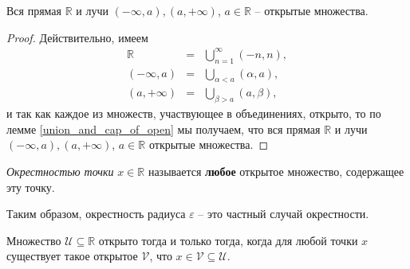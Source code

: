 \begin{corollary}\label{R_is_open}
  Вся прямая $\mathbb{R}$ и лучи $(-\infty, a), (a, +\infty)$, $a\in \mathbb{R}$ -- открытые множества.
\end{corollary}
\begin{proof}
    Действительно, имеем
    \begin{eqnarray*}
        \mathbb{R} &=& \bigcup_{n=1}^\infty (-n,n),\\
        (-\infty, a) &=& \bigcup_{\alpha <a} (\alpha, a),\\
        (a, + \infty) &=& \bigcup_{\beta >a} (a,\beta),
    \end{eqnarray*}
    и так как каждое из множеств, участвующее в объединениях, открыто, то по лемме \ref{union_and_cap_of_open} мы получаем, что вся прямая $\mathbb{R}$ и лучи $(-\infty, a), (a, +\infty)$, $a\in \mathbb{R}$ открытые множества.
\end{proof}


\begin{definition}\label{neigh_of_point}
    \textit{Окрестностью точки} $x\in \mathbb{R}$ называется \textbf{любое} открытое множество, содержащее эту точку.
\end{definition}

Таким образом, окрестность радиуса $\varepsilon$ -- это частный случай окрестности.  

\begin{proposition}\label{open_via_open}
 Множество $\mathscr{U} \subseteq \mathbb{R}$ открыто тогда и только тогда, когда для любой точки $x$ существует такое открытое $\mathscr{V}$, что $x\in \mathscr{V} \subseteq \mathscr{U}.$
\end{proposition}


